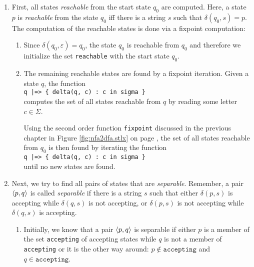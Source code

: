 \begin{enumerate}
\item First, all states \emph{reachable} from the start state $q_0$ are computed.
      Here, a state $p$ is \emph{reachable} from the state $q_0$ iff there is a string $s$
      such that $\delta(q_0, s) = p$.
      The computation of the reachable states is done via a fixpoint computation:
      \begin{enumerate}
      \item Since $\delta(q_0, \varepsilon) = q_0$, the state $q_0$ is reachable from $q_0$
            and therefore we initialize the set \texttt{reachable} with the 
            start state $q_0$.
      \item The remaining reachable states are found by a fixpoint iteration.
            Given a state $q$, the function
            \\[0.2cm]
            \hspace*{1.3cm}
            \texttt{q |=> \{ delta(q, c) : c in sigma \}}
            \\[0.2cm]
            computes the set of all states reachable from $q$ by reading some letter $c \in \Sigma$.

            Using the second order function \texttt{fixpoint} discussed in the previous chapter in
            Figure \ref{fig:nfa2dfa.stlx} on page \pageref{fig:nfa2dfa.stlx}, the set of all
            states reachable from $q_0$ is then found by iterating the function 
            \\[0.2cm]
            \hspace*{1.3cm}
            \texttt{q |=> \{ delta(q, c) : c in sigma \}}
            \\[0.2cm]
            until no new states are found.
      \end{enumerate}
\item Next, we try to find all pairs of states that are \emph{separable}. Remember, 
      a pair $\pair(p, q)$ is called \emph{separable} if there is a string $s$ such
      that either $\delta(p,s)$ is accepting while $\delta(q,s)$ is not accepting, or
      $\delta(p,s)$ is not accepting while $\delta(q,s)$ is accepting.  
      \begin{enumerate}
      \item Initially, we know that a pair $\pair(p, q)$ is separable if either
            $p$ is a member of the set \texttt{accepting} of accepting states while $q$
            is not a member of \texttt{accepting} or it is the other way around:
            $p \not\in \mathtt{accepting}$ and $q \in \mathtt{accepting}$.


\end{enumerate}
\end{enumerate}
